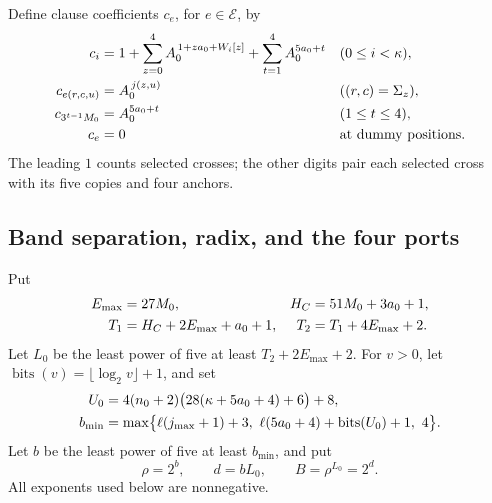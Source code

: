 Define clause coefficients \(c_e\), for \(e\in\mathcal E\), by
\begin{align}
 c_i&=1+\sum_{z=0}^4 A_0^{\,1+za_0+W_i[z]}
            +\sum_{t=1}^4 A_0^{5a_0+t}
       &&(0\le i<\kappa),\notag\\
 c_{e(r,c,u)}&=A_0^{\,j(z,u)}
       &&((r,c)=\Sigma_z),\notag\\
 c_{3^{t-1}M_0}&=A_0^{5a_0+t}
       &&(1\le t\le4),\notag\\
 c_e&=0&&\text{at dummy positions}.
 \label{eq:cross-clause-coefficients}
\end{align}
The leading \(1\) counts selected crosses; the other digits pair each
selected cross with its five copies and four anchors.

\subsection{Band separation, radix, and the four ports}

Put
\begin{align}
 E_{\max}&=27M_0,&H_C&=51M_0+3a_0+1,\notag\\
 T_1&=H_C+2E_{\max}+a_0+1,
 &T_2&=T_1+4E_{\max}+2.
 \label{eq:cross-bands}
\end{align}
Let \(L_0\) be the least power of five at least
\(T_2+2E_{\max}+2\). For \(v>0\), let
\(\operatorname{bits}(v)=\lfloor\log_2v\rfloor+1\), and set
\begin{align}
 U_0&=4(n_0+2)\bigl(28(\kappa+5a_0+4)+6\bigr)+8,\notag\\
 b_{\min}&=\max\bigl\{
       \ell(j_{\max}+1)+3,\
       \ell(5a_0+4)+\operatorname{bits}(U_0)+1,\
       4\bigr\}.
 \label{eq:cross-radix-bound}
\end{align}
Let \(b\) be the least power of five at least \(b_{\min}\), and put
\[
 \rho=2^b,\qquad d=bL_0,\qquad B=\rho^{L_0}=2^d.
\]
All exponents used below are nonnegative.

